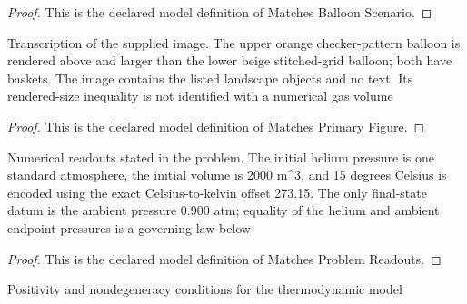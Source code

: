 \begin{proof}
  This is the declared model definition of Matches Balloon Scenario.
\end{proof}
\begin{definition}
  \label{def:physics:phyx-mini-0345:phyxminiproblems-problemphyxmini0345-matchesprimaryfigure}
  Transcription of the supplied image. The upper orange checker-pattern balloon is rendered above and larger than the lower beige stitched-grid balloon; both have baskets. The image contains the listed landscape objects and no text. Its rendered-size inequality is not identified with a numerical gas volume
\end{definition}
\begin{proof}
  This is the declared model definition of Matches Primary Figure.
\end{proof}
\begin{definition}
  \label{def:physics:phyx-mini-0345:phyxminiproblems-problemphyxmini0345-matchesproblemreadouts}
  Numerical readouts stated in the problem. The initial helium pressure is one standard atmosphere, the initial volume is 2000 m\textasciicircum{}3, and 15 degrees Celsius is encoded using the exact Celsius-to-kelvin offset 273.15. The only final-state datum is the ambient pressure 0.900 atm; equality of the helium and ambient endpoint pressures is a governing law below
\end{definition}
\begin{proof}
  This is the declared model definition of Matches Problem Readouts.
\end{proof}
\begin{definition}
  \label{def:physics:phyx-mini-0345:phyxminiproblems-problemphyxmini0345-hasphysicalballoonparameters}
  Positivity and nondegeneracy conditions for the thermodynamic model
\end{definition}
